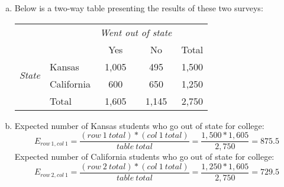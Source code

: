 %

{
{
\begin{enumerate}[(a)]
\item Below is a two-way table presenting the results of these two surveys:
\begin{center}
\begin{tabular}{l l c c c}
								&			& \multicolumn{2}{c}{\textit{Went out of state}}	&		\\
\cline{3-4}
								&			& Yes		& No		& Total	\\
\cline{2-5}
\multirow{2}{*}{\textit{State	}}		& Kansas		& 1,005		& 495	& 1,500	\\
								& California	& 600		& 650	& 1,250	\\
\cline{2-5}
								& Total		& 1,605		& 1,145	& 2,750
\end{tabular}
\end{center} 
\item Expected number of Kansas students who go out of state for college:
\[ E_{row~1, col~1} = \frac{(row~1~total)*(col~1~total)}{table~total} = \frac{1,500 * 1,605}{2,750} = 875.5 \]
Expected number of California students who go out of state for college:
\[ E_{row~2, col~1} = \frac{(row~2~total)*(col~1~total)}{table~total} = \frac{1,250 * 1,605}{2,750} = 729.5 \]
\end{enumerate}
}
}

%

